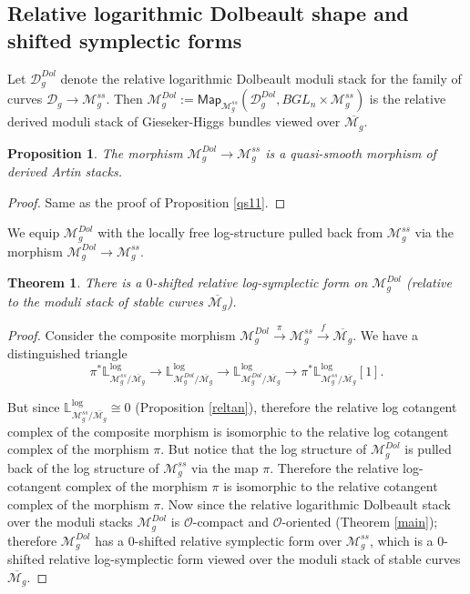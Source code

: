 \documentclass[11pt]{amsart}
\newcommand {\map} {\mathsf{Map}}
\theoremstyle{plain}
\numberwithin{equation}{section}
\theoremstyle{definition}
\theoremstyle{plain}
\newtheorem{Prop}[Def]{Proposition}
\newtheorem{Thm}[Def]{Theorem}
\begin{document}
\subsection{\textbf{Relative logarithmic Dolbeault shape and shifted symplectic forms}}

Let $\mathcal D^{Dol}_g$ denote the relative logarithmic Dolbeault moduli stack for the family of curves $\mathcal D_g\longrightarrow \mathcal M^{ss}_g$. Then $\mathcal M^{Dol}_g:=\map_{\mathcal M^{ss}_g}(\mathcal D^{Dol}_g, BGL_n\times \mathcal M^{ss}_g)$ is the relative derived moduli stack of Gieseker-Higgs bundles viewed over $\overline{\mathcal M_g}$. 

\begin{Prop}
The morphism $\mathcal M^{Dol}_g\longrightarrow \mathcal M^{ss}_g$ is a quasi-smooth morphism of derived Artin stacks.
\end{Prop}
\begin{proof}
Same as the proof of Proposition \ref{qs11}.
\end{proof}

We equip $\mathcal M^{Dol}_g$ with the locally free log-structure pulled back from $\mathcal M^{ss}_g$ via the morphism $\mathcal M^{Dol}_g\longrightarrow \mathcal M^{ss}_g$.

\begin{Thm}\label{main1567}
There is a $0$-shifted relative log-symplectic form on $\mathcal M^{Dol}_g$ (relative to the moduli stack of stable curves $\overline{\mathcal M_g}$).
\end{Thm}
\begin{proof}
Consider the composite morphism $\mathcal M^{Dol}_g\xrightarrow{\pi} \mathcal M^{ss}_g\xrightarrow{f} \overline{\mathcal M_g}$. We have a distinguished triangle
\begin{equation}
\pi^*\mathbb L^{\log}_{\mathcal M^{ss}_g/\overline{\mathcal M_g}}\longrightarrow \mathbb L^{\log}_{\mathcal M^{Dol}_g/\overline{\mathcal M_g}}\longrightarrow \mathbb L^{\log}_{\mathcal M^{Dol}_g/\overline{\mathcal M_g}}\longrightarrow \pi^*\mathbb L^{\log}_{\mathcal M^{ss}_g/\overline{\mathcal M_g}}[1].
\end{equation}

But since $\mathbb L^{\log}_{\mathcal M^{ss}_g/\overline{\mathcal M_g}}\cong 0$ (Proposition \ref{reltan}), therefore the relative log cotangent complex of the composite morphism is isomorphic to the relative log cotangent complex of the morphism $\pi$. But notice that the log structure of $\mathcal M^{Dol}_g$ is pulled back of the log structure of $\mathcal M^{ss}_g$ via the map $\pi$. Therefore the relative log-cotangent complex of the morphism $\pi$ is isomorphic to the relative cotangent complex of the morphism $\pi$. Now since the relative logarithmic Dolbeault stack over the moduli stacks $\mathcal M^{Dol}_g$ is $\mathcal O$-compact and $\mathcal O$-oriented (Theorem \ref{main}); therefore $\mathcal M^{Dol}_g$ has a $0$-shifted relative symplectic form over $\mathcal M^{ss}_g$, which is a $0$-shifted relative log-symplectic form viewed over the moduli stack of stable curves $\overline{\mathcal M_g}$.
\end{proof}
\end{document}
